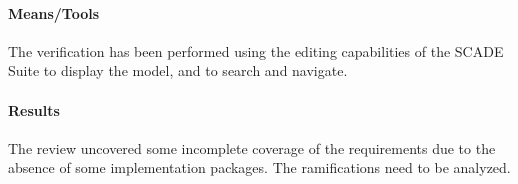 \paragraph{Means/Tools}
The verification has been performed using the editing capabilities of
the SCADE Suite to display the model, and to search and navigate.

\paragraph{Results}
The review uncovered some incomplete coverage of the requirements due
to the absence of some implementation packages. The ramifications need
to be analyzed. 



